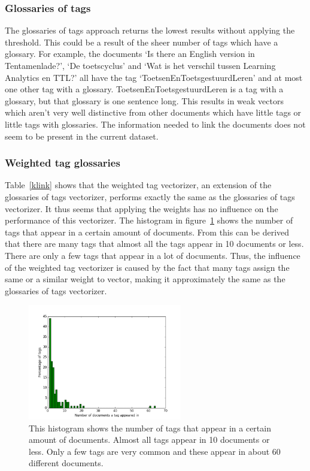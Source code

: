 \subsubsection{Glossaries of tags}
The glossaries of tags approach returns the lowest results without applying the
threshold. This could be a result of the sheer number of tags which have a glossary. For
example, the documents `Is there an English version in Tentamenlade?', `De toetscyclus' 
and `Wat is het verschil tussen Learning Analytics en TTL?' all have the 
tag `ToetsenEnToetsgestuurdLeren' and at most one other tag with a glossary. 
ToetsenEnToetsgestuurdLeren is a tag with a glossary, but that glossary is one sentence 
long. This results in weak vectors which aren't very well distinctive from other documents 
which have little tags or little tags with glossaries. The information needed to link the 
documents does not seem to be present in the current dataset.


\subsubsection{Weighted tag glossaries}
Table~\ref{klink} shows that the weighted tag vectorizer, an extension of the glossaries of tags vectorizer, performs exactly the same as the glossaries of tags vectorizer. It thus seems that applying the weights has no influence on the performance of this vectorizer. The histogram in figure~\ref{weightedtag} shows the number of tags that appear in a certain amount of documents. From this can be derived that there are many tags that almost all the tags appear in 10 documents or less. There are only a few tags that appear in a lot of documents. Thus, the influence of the weighted tag vectorizer is caused by the fact that many tags assign the same or a similar weight to vector, making it approximately the same as the glossaries of tags vectorizer.  

\begin{figure}
\center
\includegraphics[width =0.6\textwidth]{images/weightedtagexplanation}
\caption{This histogram shows the number of tags that appear in a certain amount of documents. Almost all tags appear in 10 documents or less. Only a few tags are very common and these appear in about 60 different documents.}
\label{weightedtag}
\end{figure}

